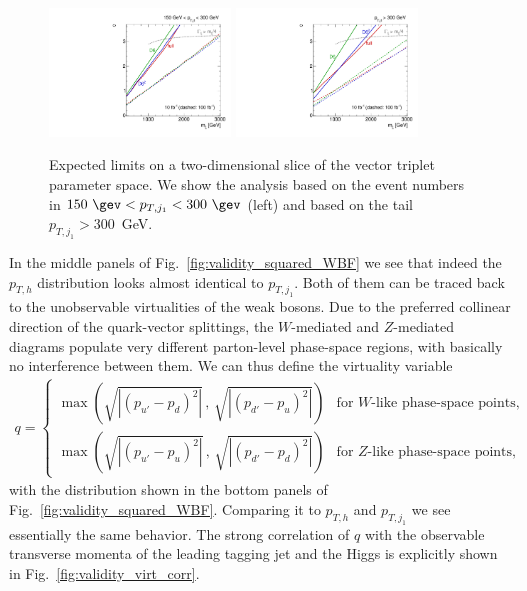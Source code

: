 \begin{figure}[b!]
  \includegraphics[width=0.43\textwidth]{fig/validity/WBF_limits_150.pdf}
  \hspace*{0.05\textwidth}
  \includegraphics[width=0.43\textwidth]{fig/validity/WBF_limits_300.pdf} 
  \caption{Expected limits on a two-dimensional slice of the vector
    triplet parameter space. We show the analysis based on the event
    numbers in $150~\gev < p_{T,j_1} < 300~\gev$ (left) and based on
    the tail $p_{T,j_1} > 300$~GeV.}
  \label{fig:validity_limits}
\end{figure}


In the middle panels of Fig.~\ref{fig:validity_squared_WBF} we see that indeed
the $p_{T,h}$ distribution looks almost identical to $p_{T,j_1}$. Both
of them can be traced back to the unobservable virtualities of the
weak bosons. Due to the preferred collinear direction of the
quark-vector splittings, the $W$-mediated and $Z$-mediated diagrams
populate very different parton-level phase-space regions, with
basically no interference between them.  We can thus define the
virtuality variable~\cite{gino,polarized_ww}
%
\begin{align}
  q =
  \begin{cases}
    \max\left(   \sqrt{ | (p_{u'} - p_{d})^2 | } \, , \, \sqrt{ | (p_{d'} - p_{u})^2 | }  \right) & \text{for $W$-like phase-space points,} \\
    \max\left(   \sqrt{ | (p_{u'} - p_{u})^2 | } \, , \, \sqrt{ | (p_{d'} - p_{d})^2 | }  \right)  & \text{for $Z$-like phase-space points,}
  \end{cases}
  \label{eq:virt}
\end{align}
%
with the distribution shown in the bottom panels of
Fig.~\ref{fig:validity_squared_WBF}. Comparing it to $p_{T,h}$ and $p_{T,j_1}$ we see
essentially the same behavior.  The strong correlation of $q$ with
the observable transverse momenta of the leading tagging jet and the
Higgs is explicitly shown in Fig.~\ref{fig:validity_virt_corr}.\bigskip

